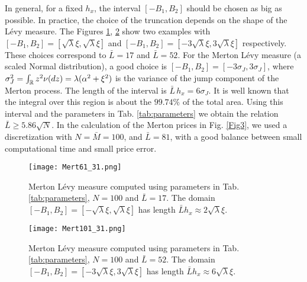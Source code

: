 In general, for a fixed $h_x$, the interval $[-B_1,B_2]$ should be chosen as big as possible. In practice, the choice of the truncation depends on the shape of the L\'evy measure.  
The Figures \ref{Fig13}, \ref{Fig14} show two examples with $[-B_1,B_2] = [\sqrt{\lambda} \xi,\sqrt{\lambda} \xi]$ and $[-B_1,B_2] = [-3\sqrt{\lambda} \xi,3\sqrt{\lambda} \xi]$ 
respectively. These choices correspond to 
$\bar L = 17$ and $\bar L = 52$.
For the Merton L\'evy measure (a scaled Normal distribution), a good choice is $[-B_1,B_2] = [-3\sigma_J,3\sigma_J]$, where  
$\sigma_J^2 = \int_{\mathbb{R}} z^2 \nu(dz) = \lambda(\alpha^2 + \xi^2)$ is the variance of the jump component of the Merton process.
The length of the interval is $\bar L \, h_x = 6\sigma_J$. 
It is well known that the integral over this region is about the $99.74\%$ of the total area.      
Using this interval and the parameters in Tab. \ref{tab:parameters} we obtain the relation $\bar L \geq 5.86 \sqrt{N}$.
In the calculation of the Merton prices in Fig. \ref{Fig3}, we used a discretization with $N=\bar M =100$, and $\bar L = 81$, 
with a good balance between small computational time and small price error. 
\begin{figure}[t!]
   \centering
   \texttt{[image: Mert61\_31.png]}
   \caption{Merton L\'evy measure computed using parameters in Tab. \ref{tab:parameters}, $N=100$ and $\bar L=17$. 
   The domain $[-B_1,B_2] = [-\sqrt{\lambda} \xi,\sqrt{\lambda} \xi]$ has length $\bar L h_x \approx 2 \sqrt{\lambda} \xi$.}
   \label{Fig13} 
\end{figure}
\begin{figure}[t!]
   \centering
   \texttt{[image: Mert101\_31.png]}
   \caption{Merton L\'evy measure computed using parameters in Tab. \ref{tab:parameters}, $N=100$ and $\bar L=52$. 
   The domain $[-B_1,B_2] = [-3\sqrt{\lambda}\xi,3\sqrt{\lambda}\xi]$ has length $\bar L h_x \approx 6 \sqrt{\lambda} \xi$.}
   \label{Fig14}
\end{figure}

